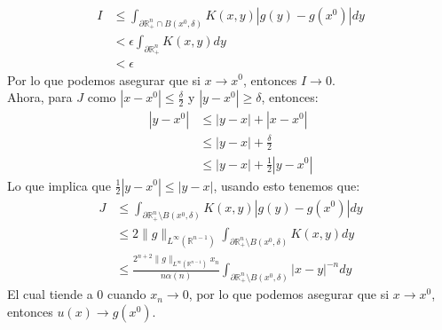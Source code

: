 \begin{homeworkProblem}
\begin{enumerate}
\begin{solucion}
      \begin{align*}
        I&\leq \int_{\partial \mathbb{R}^{n}_{+}\cap B(x^0,\delta)}K(x,y)|g(y)-g(x^0)|dy\\
        &< \epsilon \int_{\partial \mathbb{R}^{n}_{+}}K(x,y)dy\\
        &< \epsilon 
      \end{align*}
      Por lo que podemos asegurar que si $x\rightarrow x^0$, entonces $I\rightarrow 0$.\\
      Ahora, para $J$ como $|x-x^0|\leq \frac{\delta}{2}$ y $|y-x^0|\geq \delta$, entonces:
      \begin{align}
        |y-x^0|&\leq |y-x|+|x-x^0|\\
        &\leq |y-x|+\frac{\delta}{2}\\
        &\leq |y-x|+\frac{1}{2}|y-x^0|
      \end{align}
      Lo que implica que $\frac{1}{2}|y-x^0|\leq |y-x|$, usando esto tenemos que:
      \begin{align*}
        J&\leq \int_{\partial \mathbb{R}^{n}_{+}\setminus B(x^0,\delta)}K(x,y)|g(y)-g(x^0)|dy\\
        &\leq 2\|g\|_{L^{\infty}(\mathbb{R}^{n-1})}\int_{\partial \mathbb{R}^{n}_{+}\setminus B(x^0,\delta)}K(x,y)dy\\
        &\leq \frac{2^{n+2}\|g\|_{L^{\infty}(\mathbb{R}^{n-1})}x_n}{n\alpha(n)}\int_{\partial \mathbb{R}^{n}_{+}\setminus B(x^0,\delta)}|x-y|^{-n}dy
      \end{align*}
      El cual tiende a $0$ cuando $x_n\rightarrow 0$, por lo que podemos asegurar que si $x\rightarrow x^0$, entonces $u(x)\rightarrow g(x^0)$. 
    \end{solucion}
  \end{enumerate}
\end{homeworkProblem}
